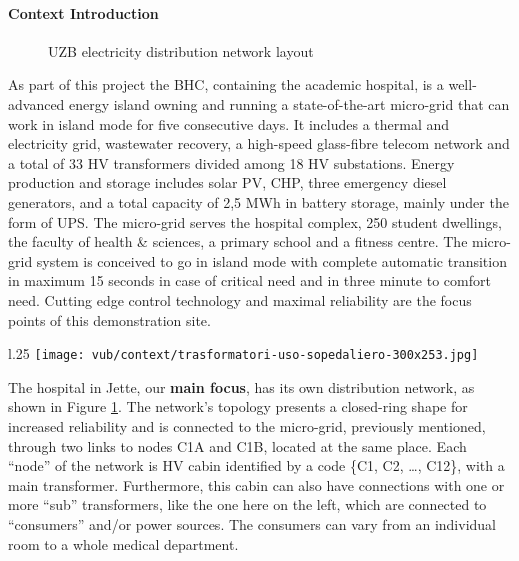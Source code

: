 \paragraph{Context Introduction}
\begin{figure}[ht]
    \caption{\acs{UZB} electricity distribution network layout}
    \label{fig:bhc_site_layout}
\end{figure}
As part of this project the \ac{BHC}, containing the academic hospital, is a well-advanced
energy island owning and running a state-of-the-art micro-grid that can work in island mode for five consecutive days.
It includes a thermal and electricity grid, wastewater recovery, a high-speed glass-fibre telecom network and a total of 33 \ac{HV} transformers divided among 18 \ac{HV} substations.
Energy production and storage includes solar PV, \ac{CHP}, three emergency diesel generators,
and a total capacity of 2,5 MWh in battery storage, mainly under the form of UPS.
The micro-grid serves the hospital complex, 250 student dwellings, the faculty of health \& sciences, a primary school and a fitness centre. 
The micro-grid system is conceived to go in island mode with complete automatic transition in maximum 15 seconds in case of critical need and in three minute to comfort need. 
Cutting edge control technology and maximal reliability are the focus points of this demonstration site.

\begin{wrapfigure}{l}{.25\textwidth}
    \centering
    \texttt{[image: vub/context/trasformatori-uso-sopedaliero-300x253.jpg]}
\end{wrapfigure}
The hospital in Jette, our \textbf{main focus}, has its own distribution network, as shown in Figure \ref{fig:bhc_site_layout}.
The network's topology presents a closed-ring shape for increased reliability and is connected to the micro-grid, previously mentioned,  
through two links to nodes C1A and C1B, located at the same place. Each ``node'' of the network is \ac{HV} cabin identified by a code \{C1, C2, \dots, C12\}, with a main transformer.
Furthermore, this cabin can also have connections with one or more ``sub'' transformers, like the one here on the left, 
which are connected to ``consumers'' and/or power sources. The consumers can vary from an individual room to a whole medical department.

